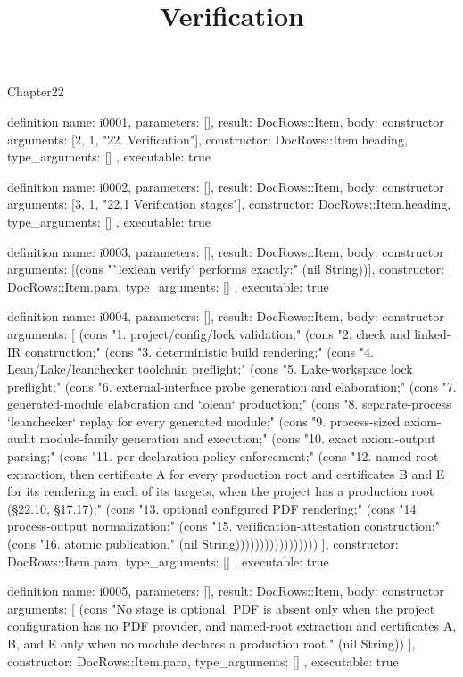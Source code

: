 \begin{lexlean}{Chapter22}
\title{Verification}
\begin{semanticmodule}
definition{
  name: i0001,
  parameters: [],
  result: DocRows::Item,
  body: constructor{
    arguments: [2, 1, "22. Verification"],
    constructor: DocRows::Item.heading,
    type_arguments: []
  },
  executable: true
}

definition{
  name: i0002,
  parameters: [],
  result: DocRows::Item,
  body: constructor{
    arguments: [3, 1, "22.1 Verification stages"],
    constructor: DocRows::Item.heading,
    type_arguments: []
  },
  executable: true
}

definition{
  name: i0003,
  parameters: [],
  result: DocRows::Item,
  body: constructor{
    arguments: [(cons "`lexlean verify` performs exactly:" (nil String))],
    constructor: DocRows::Item.para,
    type_arguments: []
  },
  executable: true
}

definition{
  name: i0004,
  parameters: [],
  result: DocRows::Item,
  body: constructor{
    arguments: [
      (cons "1. project/config/lock validation;" (cons "2. check and linked-IR construction;" (cons "3. deterministic build rendering;" (cons "4. Lean/Lake/leanchecker toolchain preflight;" (cons "5. Lake-workspace lock preflight;" (cons "6. external-interface probe generation and elaboration;" (cons "7. generated-module elaboration and `.olean` production;" (cons "8. separate-process `leanchecker` replay for every generated module;" (cons "9. process-sized axiom-audit module-family generation and execution;" (cons "10. exact axiom-output parsing;" (cons "11. per-declaration policy enforcement;" (cons "12. named-root extraction, then certificate A for every production root and certificates B and E for its rendering in each of its targets, when the project has a production root (§22.10, §17.17);" (cons "13. optional configured PDF rendering;" (cons "14. process-output normalization;" (cons "15. verification-attestation construction;" (cons "16. atomic publication." (nil String)))))))))))))))))
    ],
    constructor: DocRows::Item.para,
    type_arguments: []
  },
  executable: true
}

definition{
  name: i0005,
  parameters: [],
  result: DocRows::Item,
  body: constructor{
    arguments: [
      (cons "No stage is optional. PDF is absent only when the project configuration has no PDF provider, and named-root extraction and certificates A, B, and E only when no module declares a production root." (nil String))
    ],
    constructor: DocRows::Item.para,
    type_arguments: []
  },
  executable: true
}


\end{semanticmodule}
\end{lexlean}
